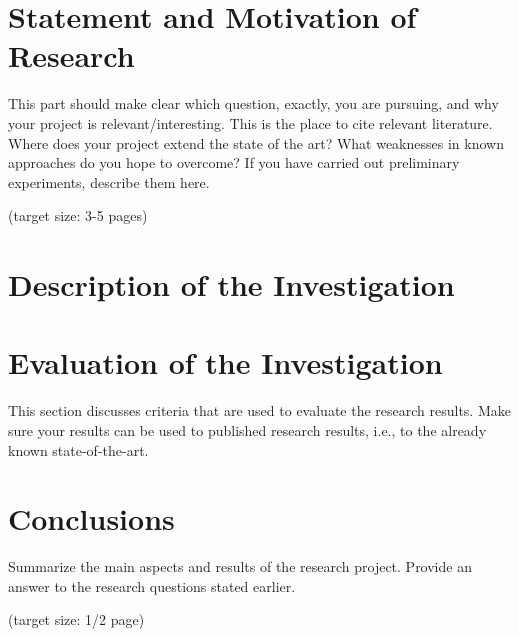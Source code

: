 \documentclass[a4paper,11pt,oneside]{article}
\begin{document}
  
  
  
  

  

  \newpage
  \tableofcontents

  \clearpage
  
  
  
  \section{Statement and Motivation of Research}

  This part should make clear which question, exactly, you are 
  pursuing, and why your project is relevant/interesting. This is the
  place to cite relevant literature. Where does your project extend
  the state of the art? What weaknesses in known approaches do you
  hope to overcome? If you have carried out preliminary experiments,
  describe them here.

  (target size: 3-5 pages)

 
  

  \section{Description of the Investigation}
  
  



  \section{Evaluation of the Investigation}

  This section discusses criteria that are used to evaluate the
  research results. Make sure your results can be used to published
  research results, i.e., to the already known state-of-the-art.



  \section{Conclusions}

  Summarize the main aspects and results of the research
  project. Provide an answer to the research questions stated earlier.

  (target size: 1/2 page)

  \nocite{JS06}

  \newpage
  
  
\end{document}

